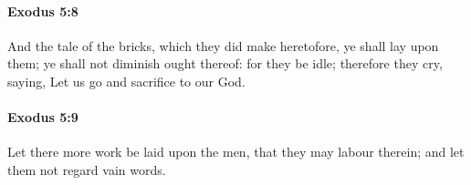 		\paragraph{Exodus 5:8} %
			\label{EXODUS-5-8}

			And the tale of the bricks, which they did make heretofore, ye shall lay upon them; ye shall not diminish ought thereof: for they be idle; therefore they cry, saying, Let us go and sacrifice to our God.


		\paragraph{Exodus 5:9} %
			\label{EXODUS-5-9}

			Let there more work be laid upon the men, that they may labour therein; and let them not regard vain words.



